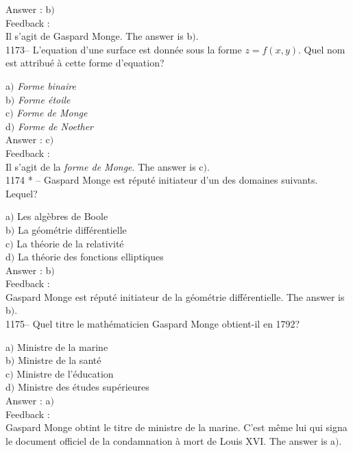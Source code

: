 \documentclass[letterpaper, 12pt]{article}
\begin{document}
Answer : b$)$\\

Feedback : \\
Il s'agit de Gaspard Monge.
The answer is b$)$.\\

1173-- L'equation d'une surface est donn\'ee sous la forme
$z=f(x,y)$. Quel nom est attribu\'e \`a cette forme d'equation?

a$)$ {\sl Forme binaire} \\
b$)$ {\sl Forme \'etoile} \\
c$)$ {\sl Forme de Monge} \\
d$)$ {\sl Forme de Noether}\\

Answer : c$)$\\

Feedback : \\
Il s'agit de la {\sl forme de Monge}.
The answer is c$)$.\\

1174 * -- Gaspard Monge est r\'eput\'e initiateur d'un des domaines
suivants. Lequel?

a$)$ Les alg\`ebres de Boole \\
b$)$ La g\'eom\'etrie diff\'erentielle \\
c$)$ La th\'eorie de la relativit\'e \\
d$)$ La th\'eorie des fonctions elliptiques\\

Answer : b$)$\\

Feedback : \\
Gaspard Monge est r\'eput\'e initiateur de la g\'eom\'etrie
diff\'erentielle.
The answer is b$)$.\\

1175-- Quel titre le math\'ematicien Gaspard Monge obtient-il en
1792?

a$)$ Ministre de la marine \\
b$)$ Ministre de la sant\'e \\
c$)$ Ministre de l'\'education  \\
d$)$ Ministre des \'etudes sup\'erieures\\

Answer : a$)$\\

Feedback : \\
Gaspard Monge obtint le titre de ministre de la marine. C'est m\^eme
lui qui signa le document officiel de la condamnation \`a mort de
Louis XVI.
The answer is a$)$.\\
\end{document}
